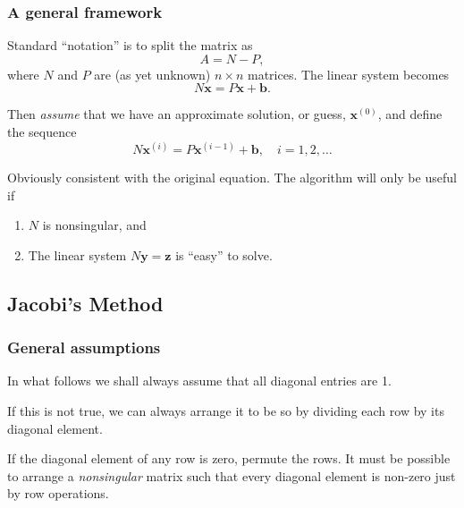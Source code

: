 \documentclass{beamer}
\newcommand{\bb}{{\boldsymbol{b}}}
\newcommand{\bx}{{\boldsymbol{x}}}
\newcommand{\bfm}[1]{{\boldsymbol{#1}}}
\begin{document}
\begin{frame}
  \frametitle{A general framework}

  Standard ``notation'' is to split the matrix as
  \begin{equation*}
    A = N - P,
  \end{equation*}
  where $N$ and $P$ are (as yet unknown) $n \times n$ matrices.
  The linear system becomes
  \begin{equation*}
    N \bx = P \bx + \bb.
  \end{equation*} \pause

  Then \emph{assume} that we have an approximate solution, or guess,
  $\bx^{(0)}$, and define the sequence
  \begin{equation*}
    N \bx^{(i)} = P \bx^{(i - 1)} + \bb, \quad i = 1, 2, \dots
  \end{equation*} \pause

  Obviously consistent with the original equation.  The algorithm will
  only be useful if
  \begin{enumerate}
  \item $N$ is nonsingular, and
  \item The linear system $N \bfm{y} = \bfm{z}$ is ``easy'' to solve.
  \end{enumerate}

\end{frame}


\subsection{Jacobi's Method}

\begin{frame}
  \frametitle{General assumptions}

  \vspace{2ex}

  In what follows we shall always assume that all diagonal entries are
  1. \pause

  \vspace{2ex}

  If this is not true, we can always arrange it to be so by dividing
  each row by its diagonal element. \pause

  \vspace{2ex}

  If the diagonal element of any row is zero, permute the rows. It
  must be possible to arrange a \emph{nonsingular} matrix such that
  every diagonal element is non-zero just by row operations.

\end{frame}
\end{document}
